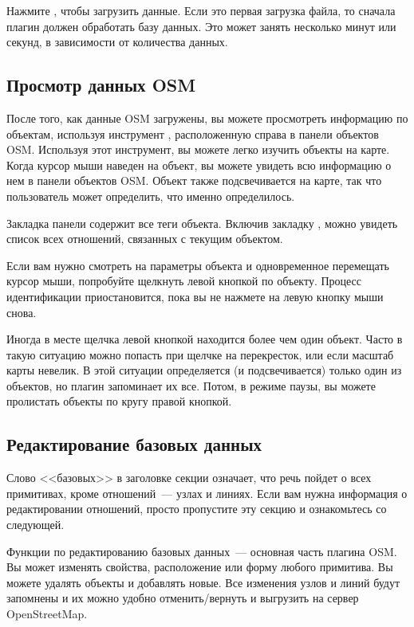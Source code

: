 Нажмите , чтобы загрузить данные. Если это первая загрузка
файла, то сначала плагин должен обработать базу данных. Это может занять
несколько минут или секунд, в зависимости от количества данных.

\subsection{Просмотр данных OSM}

После того, как данные OSM загружены, вы можете просмотреть информацию по
объектам, используя инструмент ,
расположенную справа в панели объектов OSM. Используя этот инструмент, вы
можете легко изучить объекты на карте. Когда курсор мыши наведен на
объект, вы можете увидеть всю информацию о нем в панели объектов OSM.
Объект также подсвечивается на карте, так что пользователь может
определить, что именно определилось.

Закладка  панели содержит все теги объекта. Включив
закладку , можно увидеть список всех отношений, связанных
с текущим объектом.

Если вам нужно смотреть на параметры объекта и одновременное перемещать
курсор мыши, попробуйте щелкнуть левой кнопкой по объекту. Процесс
идентификации приостановится, пока вы не нажмете на левую кнопку мыши
снова.

Иногда в месте щелчка левой кнопкой находится более чем один объект.
Часто в такую ситуацию можно попасть при щелчке на перекресток, или если
масштаб карты невелик. В этой ситуации определяется (и подсвечивается)
только один из объектов, но плагин запоминает их все. Потом, в режиме
паузы, вы можете пролистать объекты по кругу правой кнопкой.

\subsection{Редактирование базовых данных}

Слово <<базовых>> в заголовке секции означает, что речь пойдет о всех
примитивах, кроме отношений~--- узлах и линиях. Если вам нужна информация
о редактировании отношений, просто пропустите эту секцию и ознакомьтесь
со следующей.

Функции по редактированию базовых данных~--- основная часть плагина OSM.
Вы может изменять свойства, расположение или форму любого примитива. Вы
можете удалять объекты и добавлять новые. Все изменения узлов и линий
будут запомнены и их можно удобно отменить/вернуть и выгрузить на сервер
OpenStreetMap.

